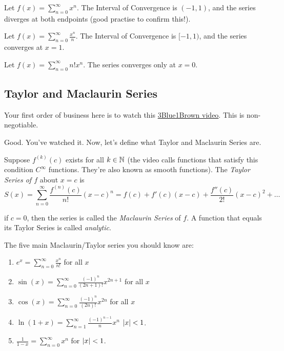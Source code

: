 \documentclass{article}
\begin{document}
    { \everymath{\displaystyle}
      \begin{eg}
        Let \(f(x) = \sum_{n=0}^{\infty}x^n\). The Interval of Convergence is \((-1, 1)\), and the series diverges at both endpoints (good practise to confirm this!).
      \end{eg}

      \begin{eg}
        Let \(f(x) = \sum_{n=0}^{\infty}\frac{x^n}{n}\). The Interval of Convergence is \([-1, 1)\), and the series converges at \(x = 1\).
      \end{eg}

      \begin{eg}
        Let \(f(x) = \sum_{n=0}^{\infty}n!x^n\). The series converges only at \(x = 0\).
      \end{eg}
    }



    \subsection{Taylor and Maclaurin Series}
    Your first order of business here is to watch this \href{https://youtu.be/3d6DsjIBzJ4?si=7VURiutstrxDzuGF}{3Blue1Brown video}. This is non-negotiable.

    Good. You've watched it. Now, let's define what Taylor and Maclaurin Series are.

    \begin{defi}
      Suppose \(f^{(k)}(c)\) exists for all \(k \in \mathbb{N}\) (the video calls functions that satisfy this condition \(C^{\infty}\) functions. They're also known as smooth functions). The \emph{Taylor Series of \(f\)} about \(x = c\) is 
      \[
        S(x) = \sum_{n=0}^{\infty}\frac{f^{(n)}(c)}{n!}(x-c)^n = f(c) + f'(c)(x-c) + \frac{f''(c)}{2!}(x-c)^2 + \ldots
      \]

      if \(c = 0\), then the series is called the \emph{Maclaurin Series} of \(f\). A function that equals its Taylor Series is called \emph{analytic}.
    \end{defi}

    The five main Maclaurin/Taylor series you should know are:
    \begin{enumerate}
      \everymath{\displaystyle}
      \item \(e^x = \sum_{n=0}^{\infty}\frac{x^n}{n!}\) for all \(x\)
      \item \(\sin(x) = \sum_{n=0}^{\infty}\frac{(-1)^n}{(2n+1)!}x^{2n+1}\) for all \(x\)
      \item \(\cos(x) = \sum_{n=0}^{\infty}\frac{(-1)^n}{(2n)!}x^{2n}\) for all \(x\)
      \item \(\ln(1+x) = \sum_{n=1}^{\infty}\frac{(-1)^{n-1}}{n}x^n\) \(\left\lvert x\right\rvert < 1\).
      \item \(\frac{1}{1-x} = \sum_{n=0}^{\infty}x^n\) for \(\left\lvert x\right\rvert < 1\).
    \end{enumerate}
    
\end{document}
